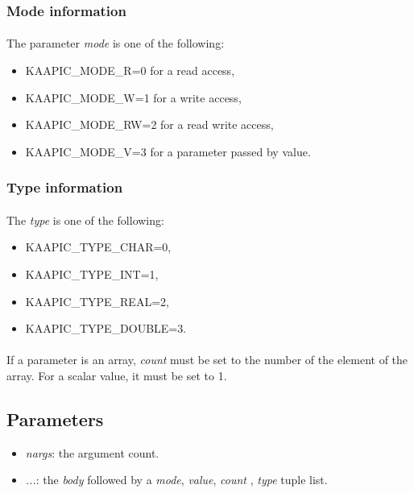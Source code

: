\documentclass[a4paper, 11pt]{article}
\begin{document}
\subsubsection{Mode information}
\paragraph{}
The parameter \textit{mode} is one of the following:
\begin{itemize}
\item KAAPIC\_MODE\_R=0 for a read access,
\item KAAPIC\_MODE\_W=1 for a write access,
\item KAAPIC\_MODE\_RW=2 for a read write access,
\item KAAPIC\_MODE\_V=3 for a parameter passed by value.
\end{itemize}

\subsubsection{Type information}
\paragraph{}
The \textit{type} is one of the following:
\begin{itemize}
\item KAAPIC\_TYPE\_CHAR=0,
\item KAAPIC\_TYPE\_INT=1,
\item KAAPIC\_TYPE\_REAL=2,
\item KAAPIC\_TYPE\_DOUBLE=3.
\end{itemize}

\paragraph{}
If a parameter is an array, \textit{count} must be set to the number of the element of the array.
For a scalar value, it must be set to 1.


\subsection{Parameters}
\begin{itemize}
\item \textit{nargs}: the argument count.
\item \textit{...}: the \textit{body} followed by a \textit{mode}, \textit{value}, \textit{count} , \textit{type}  tuple list.
\end{itemize}
\end{document}
